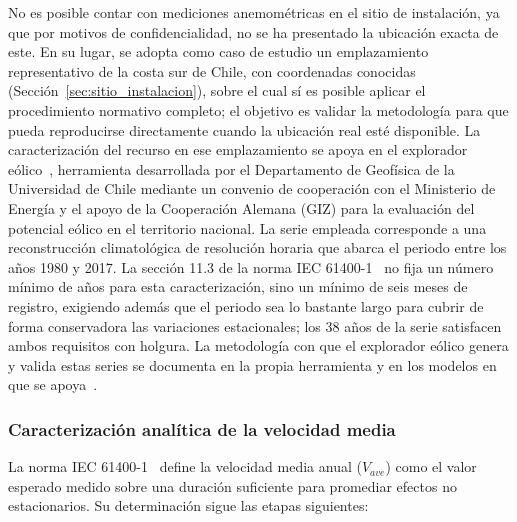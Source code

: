 No es posible contar con mediciones anemométricas en el sitio de instalación, ya que por motivos de confidencialidad, no se ha presentado la ubicación exacta de este. En su lugar, se adopta como caso de estudio un emplazamiento representativo de la costa sur de Chile, con coordenadas conocidas (Sección~\ref{sec:sitio_instalacion}), sobre el cual sí es posible aplicar el procedimiento normativo completo; el objetivo es validar la metodología para que pueda reproducirse directamente cuando la ubicación real esté disponible. La caracterización del recurso en ese emplazamiento se apoya en el explorador eólico~\parencite{ExploradorEolico2018}, herramienta desarrollada por el Departamento de Geofísica de la Universidad de Chile mediante un convenio de cooperación con el Ministerio de Energía y el apoyo de la Cooperación Alemana (GIZ) para la evaluación del potencial eólico en el territorio nacional. La serie empleada corresponde a una reconstrucción climatológica de resolución horaria que abarca el periodo entre los años 1980 y 2017. La sección 11.3 de la norma IEC 61400-1~\parencite*{IEC61400-1} no fija un número mínimo de años para esta caracterización, sino un mínimo de seis meses de registro, exigiendo además que el periodo sea lo bastante largo para cubrir de forma conservadora las variaciones estacionales; los 38 años de la serie satisfacen ambos requisitos con holgura. La metodología con que el explorador eólico genera y valida estas series se documenta en la propia herramienta y en los modelos en que se apoya~\parencite{ExploradorEolico2018,Skamarock2008,Powers2017,Gelaro2017}.

\subsubsection{Caracterización analítica de la velocidad media}

La norma IEC 61400-1~\parencite*{IEC61400-1} define la velocidad media anual ($V_{ave}$) como el valor esperado medido sobre una duración suficiente para promediar efectos no estacionarios. Su determinación sigue las etapas siguientes:

